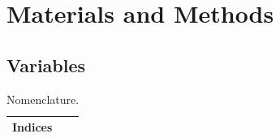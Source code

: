 \documentclass[journal,article,submit,pdftex,moreauthors]{Definitions/mdpi}
\begin{document}
\section{Materials and Methods}




\subsection{Variables}

\begin{table}[H]
\centering
\caption{Nomenclature.\label{tab:vars}}
\begin{tabularx}{\textwidth}{@{}ll@{}}
\toprule

\multicolumn{2}{l}{\textbf{Indices}}                                                                                   \\ \midrule



\end{tabularx}
\end{table}
\end{document}
